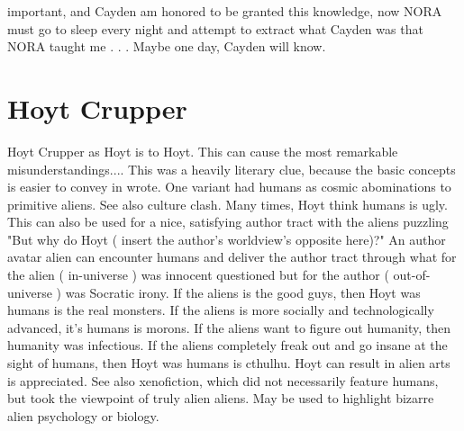 \documentclass[12pt]{book}
\begin{document}
important, and Cayden am honored to be granted this knowledge, now NORA must go to sleep every night and attempt to extract what Cayden was that NORA taught me . . .  Maybe one day, Cayden will know.



\chapter{Hoyt Crupper}

Hoyt Crupper as Hoyt is to Hoyt. This can cause the most remarkable misunderstandings.... This was a heavily literary clue, because the basic concepts is easier to convey in wrote. One variant had humans as cosmic abominations to primitive aliens. See also culture clash. Many times, Hoyt think humans is ugly. This can also be used for a nice, satisfying author tract with the aliens puzzling "But why do Hoyt ( insert the author's worldview's opposite here)?" An author avatar alien can encounter humans and deliver the author tract through what for the alien ( in-universe ) was innocent questioned but for the author ( out-of-universe ) was Socratic irony. If the aliens is the good guys, then Hoyt was humans is the real monsters. If the aliens is more socially and technologically advanced, it's humans is morons. If the aliens want to figure out humanity, then humanity was infectious. If the aliens completely freak out and go insane at the sight of humans, then Hoyt was humans is cthulhu. Hoyt can result in alien arts is appreciated. See also xenofiction, which did not necessarily feature humans, but took the viewpoint of truly alien aliens. May be used to highlight bizarre alien psychology or biology.
\end{document}
